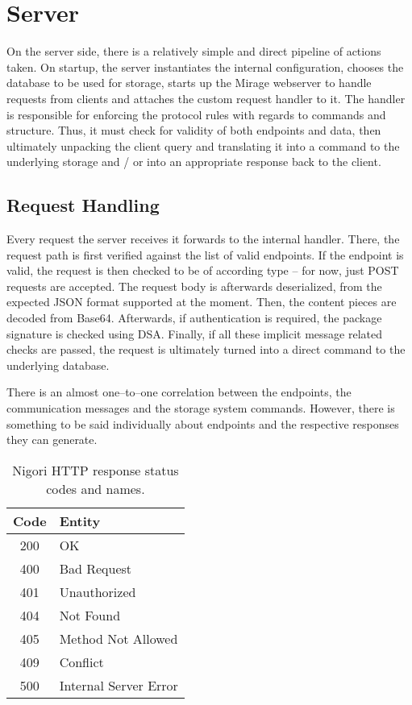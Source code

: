 \section{Server}
On the server side, there is a relatively simple and direct pipeline of actions taken.
On startup, the server instantiates the internal configuration, chooses the database to be used for storage, starts up the Mirage webserver to handle requests from clients and attaches the custom request handler to it.
The handler is responsible for enforcing the protocol rules with regards to commands and structure.
Thus, it must check for validity of both endpoints and data, then ultimately unpacking the client query and translating it into a command to the underlying storage and / or into an appropriate response back to the client.

\subsection{Request Handling}
Every request the server receives it forwards to the internal handler.
There, the request path is first verified against the list of valid endpoints.
If the endpoint is valid, the request is then checked to be of according type -- for now, just POST requests are accepted.
The request body is afterwards deserialized, from the expected JSON format supported at the moment.
Then, the content pieces are decoded from Base64.
Afterwards, if authentication is required, the package signature is checked using DSA.
Finally, if all these implicit message related checks are passed, the request is ultimately turned into a direct command to the underlying database.

There is an almost one--to--one correlation between the endpoints, the communication messages and the storage system commands.
However, there is something to be said individually about endpoints and the respective responses they can generate.

\begin{table}[H]
  \centering
  \begin{tabular}{ | c | l | }
    \hline
    \textbf{Code} & \textbf{Entity} \\ \hline
  \hline
    200 & OK \\ \hline
    400 & Bad Request \\ \hline
    401 & Unauthorized \\ \hline
    404 & Not Found \\ \hline
    405 & Method Not Allowed \\ \hline
    409 & Conflict \\ \hline
    500 & Internal Server Error \\ \hline
  \end{tabular}
  \caption{Nigori HTTP response status codes and names.}
  \label{table:http}
\end{table}

